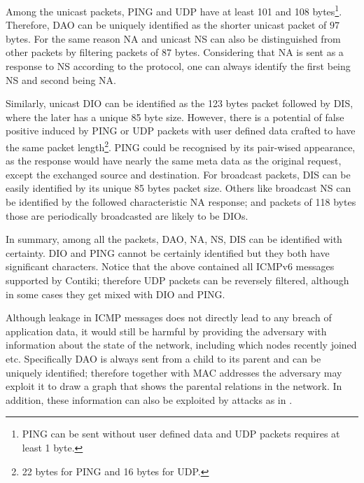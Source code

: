 \documentclass{article}
\begin{document}

Among the unicast packets, PING and UDP have at least 101 and 108 bytes\footnote{PING can be sent without user defined data and UDP packets requires at least 1 byte.}. Therefore, DAO can be uniquely identified as the shorter unicast packet of $97$ bytes.  For the same reason NA and unicast NS can also be distinguished from other packets by filtering packets of $87$ bytes. Considering that NA is sent as a response to NS according to the protocol, one can always identify the first being NS and second being NA. 

Similarly, unicast DIO can be identified as the 123 bytes packet followed by DIS, where the later has a unique 85 byte size. However, there is a potential of false positive induced by PING or UDP packets with user defined data crafted to have the same packet length\footnote{22 bytes for PING and 16 bytes for UDP.}. PING could be recognised by its pair-wised appearance, as the response would have nearly the same meta data as the original request, except the exchanged source and destination. For broadcast packets, DIS can be easily identified by its unique 85 bytes packet size. Others like broadcast NS can be identified by the followed characteristic NA response; and packets of 118 bytes those are periodically broadcasted are likely to be DIOs.

In summary, among all the packets, DAO, NA, NS, DIS can be identified with certainty. DIO and PING cannot be certainly identified but they both have significant characters. Notice that the above contained all ICMPv6 messages supported by Contiki; therefore UDP packets can be reversely filtered, although in some cases they get mixed with DIO and PING.

Although leakage in ICMP messages does not directly lead to any breach of application data, it would still be harmful by providing the adversary with information about the state of the network, including which nodes recently joined etc. Specifically DAO is always sent from a child to its parent and can be uniquely identified; therefore together with MAC addresses the adversary may exploit it to draw a graph that shows the parental relations in the network. In addition, these information can also be exploited by attacks as in \cite{WsnIcmp}.

\end{document}
